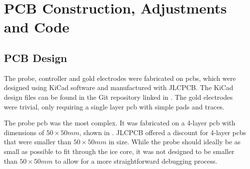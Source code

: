 
\chapter{PCB Construction, Adjustments and Code}

\section{PCB Design}

The probe, controller and gold electrodes were fabricated on \glspl{pcb}, which were designed using KiCad software and manufactured with JLCPCB.
The KiCad design files can be found in the Git repository linked in . 
The gold electrodes were trivial, only requiring a single layer \gls{pcb} with simple pads and traces.

The probe \gls{pcb} was the most complex.
It was fabricated on a 4-layer \gls{pcb} with dimensions of $50\times 50mm$, shown in .
JLCPCB offered a discount for 4-layer \glspl{pcb} that were smaller than $50\times 50mm$ in size.
While the probe should ideally be as small as possible to fit through the ice core, it was not designed to be smaller than $50\times 50mm$ to allow for a more straightforward debugging process.

